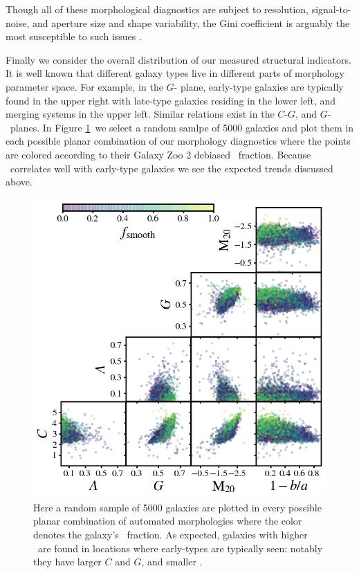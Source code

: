 Though all of these morphological diagnostics are subject to resolution, signal-to-noise, and aperture size and shape variability, the Gini coefficient is arguably the most susceptible to such issues \citep{Lisker2008}. 

Finally we consider the overall distribution of our measured structural indicators. It is well known that different galaxy types live in different parts of morphology parameter space. For example, in the $G$- plane, early-type galaxies are typically found in the upper right with late-type galaxies residing in the lower left, and merging systems in the upper left. Similar relations exist in the $C$-$G$, and $G$-~planes. In Figure \ref{fig: morphs as a fcn of fsmooth}~we select a random samlpe of 5000 galaxies and plot them in each possible planar combination of our morphology diagnostics where the points are colored according to their Galaxy Zoo 2 debiased \fsmooth~fraction. Because \fsmooth~correlates well with early-type galaxies we see the expected trends discussed above. 

\begin{figure}
\centering
\includegraphics[width=5in]{Figures/morph_params_random_sample_fsmooth_colored_clean.png}
\caption[Automated morphologies as a function of Galaxy Zoo 2 \fsmooth]{Here a random sample of 5000 galaxies are plotted in every possible planar combination of automated morphologies where the color denotes the galaxy's \fsmooth~fraction. As expected, galaxies with higher \fsmooth~are found in locations where early-types are typically seen: notably they have larger $C$ and $G$, and smaller .}
\label{fig: morphs as a fcn of fsmooth}
\end{figure}


